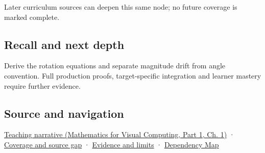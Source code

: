 \hypertarget{appendix-f77eadcc4a93-used-by}{}

Later curriculum sources can deepen this same node; no future coverage is marked complete.

\subsection{Recall and next depth}\label{appendix-f77eadcc4a93-recall-and-next-depth}

\hypertarget{appendix-f77eadcc4a93-recall-and-next-depth}{}

Derive the rotation equations and separate magnitude drift from angle convention. Full production proofs, target-specific integration and learner mastery require further evidence.

\subsection{Source and navigation}\label{appendix-f77eadcc4a93-source-and-navigation}

\hypertarget{appendix-f77eadcc4a93-source-and-navigation}{}

\href{../02-Mathematics-for-Visual-Computing-P01/main.pdf\#01-foundations-i-ch017-rotation-first-becomes-understandable-in-a-plane}{Teaching narrative (Mathematics for Visual Computing, Part 1, Ch. 1)} · \hyperref[appendix-fd090d982a15-phase-6---parts-501-600]{Coverage and source gap} · \hyperref[appendix-a103e7846d21-phase-6---source-analysis-and-verification]{Evidence and limits} · \hyperref[appendix-4ad47bdd269a]{Dependency Map}
